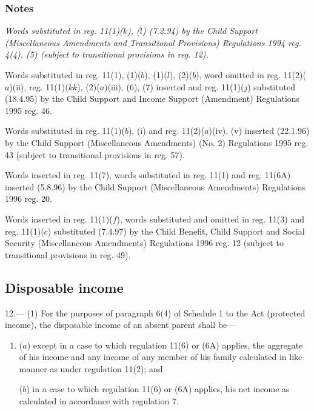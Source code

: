 \documentclass[a4paper]{article}
\newcommand\amendment[1]{\subsubsection*{Notes}{\itshape\frenchspacing\footnotesize #1 \par\goodbreak}}
\begin{document}
\amendment{
Words substituted in reg. 11(1)($k$), ($l$) (7.2.94) by the Child Support (Miscellaneous Amendments and Transitional Provisions) Regulations 1994 reg. 4(4), (5) (subject to transitional provisions in reg. 12).

Words substituted in reg. 11(1), (1)($b$), (1)($l$), (2)($b$), word omitted in reg. 11(2)($a$)(ii), reg. 11(1)($kk$), (2)($a$)(iii), (6), (7) inserted and reg. 11(1)($j$) substituted (18.4.95) by the Child Support and Income Support (Amendment) Regulations 1995 reg. 46.

Words substituted in reg. 11(1)($b$), (i) and reg. 11(2)($a$)(iv), (v) inserted (22.1.96) by the Child Support (Miscellaneous Amendments) (No. 2) Regulations 1995 reg. 43 (subject to transitional provisions in reg. 57).

Words inserted in reg. 11(7), words substituted in reg. 11(1) and reg. 11(6A) inserted (5.8.96) by the Child Support (Miscellaneous Amendments) Regulations 1996 reg. 20.

Words inserted in reg. 11(1)($f$), words substituted and omitted in reg. 11(3) and reg. 11(1)($c$) substituted (7.4.97) by the Child Benefit, Child Support and Social Security (Miscellaneous Amendments) Regulations 1996 reg. 12 (subject to transitional provisions in reg. 49).
}

\subsection[12. Disposable income]{Disposable income}

12.—%
(1) For the purposes of paragraph 6(4) of Schedule 1 to the Act (protected income), the disposable income of an absent parent shall be—
\begin{enumerate}\item[]
($a$) except in a case to which regulation 11(6) 
or (6A)  %
applies, the aggregate of his income and any income of any member of his family calculated in like manner as under regulation 11(2); and

($b$) in a case to which regulation 11(6) 
or (6A)  %
applies, his net income as calculated in accordance with regulation 7.
\end{enumerate}
\end{document}
